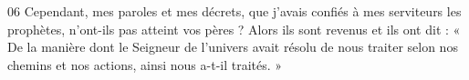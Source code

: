 
06 Cependant, mes paroles et mes décrets, que j’avais confiés à mes serviteurs les prophètes, n’ont-ils pas atteint vos pères ? Alors ils sont revenus et ils ont dit : « De la manière dont le Seigneur de l’univers avait résolu de nous traiter selon nos chemins et nos actions, ainsi nous a-t-il traités. »